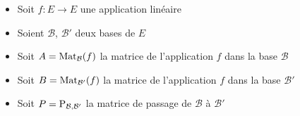 % 
% 
%   
%   
%   
%   
%   
%   
%   
% 
% 
% 


\begin{frame}

\pause
\begin{itemize} 
  \item Soit $f : E \to E$ une application linéaire
  \pause
  \item Soient $\mathcal{B}$, $\mathcal{B}'$ deux bases de $E$
  \pause
  \item Soit $A = \mathop{\text{Mat}}\nolimits_{\mathcal{B}} (f)$ 
  la matrice de l'application $f$ dans la base 
  $\mathcal{B}$
  \pause
  \item Soit $B = \mathop{\text{Mat}}\nolimits_{\mathcal{B}'} (f)$ 
  la matrice de l'application $f$ dans
  la base $\mathcal{B}'$ 
  \pause
  \item Soit $P = \mathop{\text{P}}\nolimits_{\mathcal{B},\mathcal{B}'}$ 
  la matrice de passage de $\mathcal{B}$ à $\mathcal{B}'$
\end{itemize}

\pause

\begin{theoreme}
\label{cor:changementbase}
\end{theoreme}
\end{frame}


